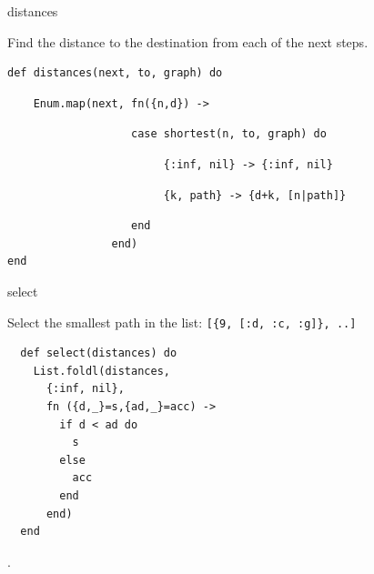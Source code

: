\begin{frame}[fragile]{distances}

  Find the distance to the destination from each of the next steps.

\vspace{20pt} \pause

\begin{verbatim}
def distances(next, to, graph) do
\end{verbatim}
\pause
\begin{verbatim}
    Enum.map(next, fn({n,d}) ->
\end{verbatim}
\pause
\begin{verbatim}
                   case shortest(n, to, graph) do
\end{verbatim}
\pause
\begin{verbatim}
                        {:inf, nil} -> {:inf, nil}
\end{verbatim}
\pause
\begin{verbatim}
                        {k, path} -> {d+k, [n|path]}
\end{verbatim}
\pause
\begin{verbatim}
                   end
                end)
end
\end{verbatim}
\end{frame}

\begin{frame}[fragile]{select}

Select the smallest path in the list: \texttt{[\{9, [:d, :c, :g]\}, ..]}

\vspace{10pt}\pause

\begin{verbatim}
  def select(distances) do
    List.foldl(distances,
      {:inf, nil},
      fn ({d,_}=s,{ad,_}=acc) ->
        if d < ad do
          s
        else
          acc
        end
      end)
  end
\end{verbatim}

\pause{}.
\end{frame}


